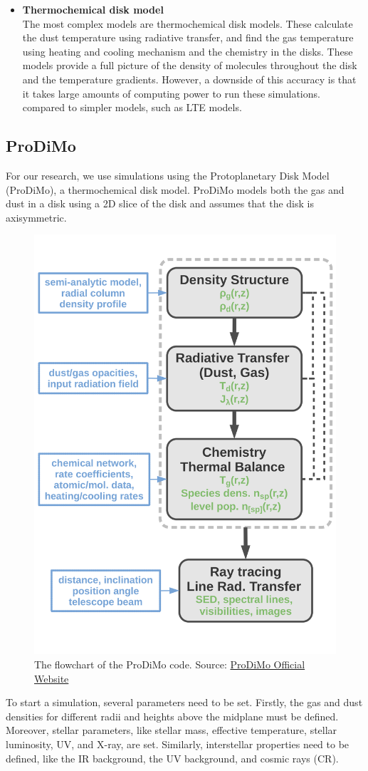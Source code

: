 \documentclass[oneside, single, authoryear, semicolon, 12pt]{lion-msc}
\newcommand{\4}{$_4$}
\newcommand{\3}{$_3$}
\newcommand{\2}{$_2$}
\begin{document}
\begin{itemize}
    \item \textbf{Thermochemical disk model} \\
    The most complex models are thermochemical disk models. These calculate the dust temperature using radiative transfer, and find the gas temperature using heating and cooling mechanism and the chemistry in the disks. These models provide a full picture of the density of molecules throughout the disk and the temperature gradients. However, a downside of this accuracy is that it takes large amounts of computing power to run these simulations. compared to simpler models, such as LTE models. 
\end{itemize}

\subsection{ProDiMo}
For our research, we use simulations using the Protoplanetary Disk Model (ProDiMo), a thermochemical disk model. ProDiMo models both the gas and dust in a disk using a 2D slice of the disk and assumes that the disk is axisymmetric. 

\begin{figure}[H]
    \centering
    \includegraphics[width=0.5\linewidth]{Figures/prodimoflowchart (1).png}
    \caption{The flowchart of the ProDiMo code. Source: \href{https://prodimo.iwf.oeaw.ac.at/}{ProDiMo Official Website}}
    \label{fig:enter-label}
\end{figure}

To start a simulation, several parameters need to be set. Firstly, the gas and dust densities for different radii and heights above the midplane must be defined. Moreover, stellar parameters, like stellar mass, effective temperature, stellar luminosity, UV, and X-ray, are set. Similarly, interstellar properties need to be defined, like the IR background, the UV background, and cosmic rays (CR). 
\end{document}
